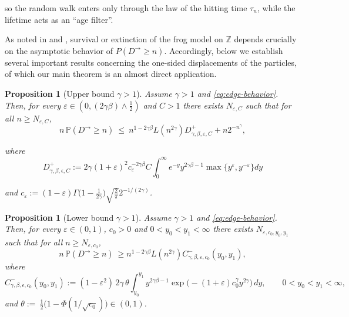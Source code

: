 \documentclass[preprint]{imsart}
\newcommand{\PP}{\mathbb{P}}
\newcommand{\1}{\mathbf{1}}
\theoremstyle{plain}
\newtheorem{proposition}[theorem]{Proposition}
\theoremstyle{definition}
\begin{document}
so the random walk enters only through the law of the hitting time $\tau_n$, while the lifetime acts as an “age filter”.

As noted in \cite{CarvalhoMachado2025} and  \cite{JGF}, survival or extinction of the frog model on $\mathbb{Z}$ depends crucially on the asymptotic behavior of $P(D^\rightarrow \ge n)$. Accordingly, below we establish several important results concerning the one-sided displacements of the particles, of which our main theorem is an almost direct application.

\begin{proposition}[Upper bound \(\gamma > 1\)]\label{prop:upper-gamma>1-EN-eps}
Assume \(\gamma>1\) and \eqref{eq:edge-behavior}. Then, for every $\varepsilon\in(0,(2\gamma\beta)\wedge\tfrac{1}{2})$ and \(C>1\) there exists $N_{\varepsilon,C}$ such that for all $n\ge N_{\varepsilon,C}$,
\begin{equation}\label{eq:upper-gamma>1-EN-eps}
n\,\PP(D^{\rightarrow}\ge n)\ \le\ n^{1-2\gamma\beta}L(n^{2\gamma})D^+_{\gamma,\beta,\varepsilon,C}+n2^{-n^\gamma},
\end{equation}


where 
\[
D^+_{\gamma,\beta,\epsilon,C}:=2\gamma (1+\varepsilon)^{2} c_{\varepsilon}^{-2\gamma\beta}C\int_{0}^{\infty}e^{-y}y^{2\gamma\beta-1}\max\{y^{\varepsilon},y^{-\varepsilon}\}dy
\]

and \(c_{\varepsilon}:=(1-\varepsilon)\Gamma\!\bigl(1-\tfrac{1}{2\gamma}\bigr)\sqrt{\tfrac{2}{\pi}}2^{-1/(2\gamma)}\). 


\end{proposition}





\begin{proposition}[Lower bound \(\gamma>1\)]\label{prop:lower-gamma>1-EN-eps}
Assume \(\gamma>1\) and \eqref{eq:edge-behavior}. Then, for every \(\varepsilon\in(0,1)\), \(c_0>0\) and \(0<y_0<y_1<\infty\) there exists $N_{\varepsilon,c_0,y_0,y_1}$ such that for all $n\ge N_{\varepsilon,c_0}$,
\begin{equation}\label{eq:lower-gamma>1-EN-eps}
n\,\PP(D^{\rightarrow}\ge n)\ \ge n^{1-2\gamma\beta}L(n^{2\gamma})C^-_{\gamma,\beta,\varepsilon,c_0}(y_0,y_1),
\end{equation}
where
\[
C^-_{\gamma,\beta,\epsilon,c_0}(y_0,y_1)
:= (1-\varepsilon^2)\,2\gamma\,\theta\int_{y_0}^{y_1} y^{2\gamma\beta-1}\exp\!\big(-(1+\varepsilon)c_0^{\gamma}y^{2\gamma}\big)\,dy,
\qquad 0<y_0<y_1<\infty,
\]
and \(\theta :=\ \tfrac12\big(1-\Phi(1/\sqrt{c_0})\big)\in(0,1)\).
\end{proposition}
\end{document}
